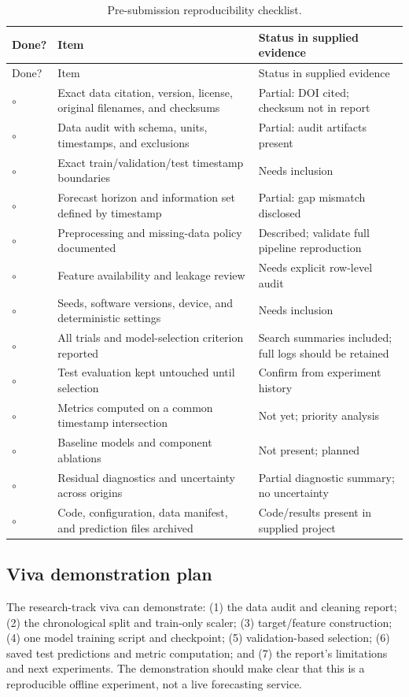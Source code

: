 \documentclass[12pt,a4paper]{article}
\begin{document}
\begin{longtable}{p{.06\linewidth}p{.65\linewidth}p{.21\linewidth}}
\caption{Pre-submission reproducibility checklist.}\\
\toprule Done? & Item & Status in supplied evidence \\\midrule\endfirsthead
\toprule Done? & Item & Status in supplied evidence \\\midrule\endhead
$\circ$ & Exact data citation, version, license, original filenames, and checksums & Partial: DOI cited; checksum not in report\\
$\circ$ & Data audit with schema, units, timestamps, and exclusions & Partial: audit artifacts present\\
$\circ$ & Exact train/validation/test timestamp boundaries & Needs inclusion\\
$\circ$ & Forecast horizon and information set defined by timestamp & Partial: gap mismatch disclosed\\
$\circ$ & Preprocessing and missing-data policy documented & Described; validate full pipeline reproduction\\
$\circ$ & Feature availability and leakage review & Needs explicit row-level audit\\
$\circ$ & Seeds, software versions, device, and deterministic settings & Needs inclusion\\
$\circ$ & All trials and model-selection criterion reported & Search summaries included; full logs should be retained\\
$\circ$ & Test evaluation kept untouched until selection & Confirm from experiment history\\
$\circ$ & Metrics computed on a common timestamp intersection & Not yet; priority analysis\\
$\circ$ & Baseline models and component ablations & Not present; planned\\
$\circ$ & Residual diagnostics and uncertainty across origins & Partial diagnostic summary; no uncertainty\\
$\circ$ & Code, configuration, data manifest, and prediction files archived & Code/results present in supplied project\\
\bottomrule\end{longtable}

\subsection{Viva demonstration plan}
The research-track viva can demonstrate: (1) the data audit and cleaning report; (2) the chronological split and train-only scaler; (3) target/feature construction; (4) one model training script and checkpoint; (5) validation-based selection; (6) saved test predictions and metric computation; and (7) the report's limitations and next experiments. The demonstration should make clear that this is a reproducible offline experiment, not a live forecasting service.
\end{document}
